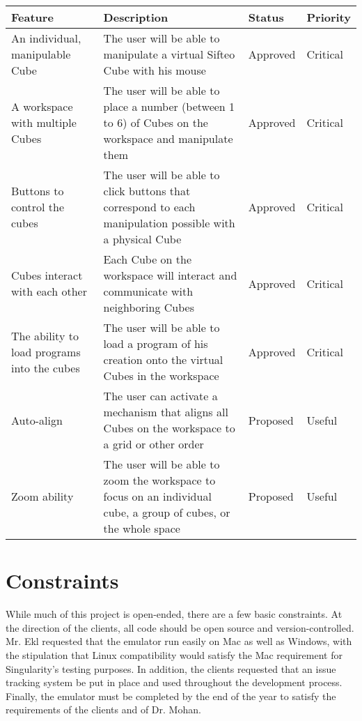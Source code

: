 \documentclass[12pt]{article}
\begin{document}
    \begin{table}[h]
      \begin{tabular}{p{1.5in} | p{1.75in} | p{1in} | p{1in}}
        \textbf{Feature} & \textbf{Description} & \textbf{Status} & \textbf{Priority} \\ \hline

        An individual, manipulable Cube &
        The user will be able to manipulate a virtual Sifteo Cube with his mouse &
        Approved &
        Critical \\ \hline

        A workspace with multiple Cubes &
        The user will be able to place a number (between 1 to 6) of Cubes on the workspace and manipulate them &
        Approved &
        Critical \\ \hline

        Buttons to control the cubes &
        The user will be able to click buttons that correspond to each manipulation possible with a physical Cube &
        Approved &
        Critical \\ \hline

        Cubes interact with each other &
        Each Cube on the workspace will interact and communicate with neighboring Cubes &
        Approved &
        Critical \\ \hline

        The ability to load programs into the cubes &
        The user will be able to load a program of his creation onto the virtual Cubes in the workspace &
        Approved &
        Critical \\ \hline

        Auto-align &
        The user can activate a mechanism that aligns all Cubes on the workspace to a grid or other order &
        Proposed &
        Useful \\ \hline

        Zoom ability &
        The user will be able to zoom the workspace to focus on an individual cube, a group of cubes, or the whole space &
        Proposed &
        Useful
      \end{tabular}
    \end{table}

\section{Constraints}
        While much of this project is open-ended, there are a few basic constraints. At the direction of the clients, all code should be open source and version-controlled. Mr. Ekl requested that the emulator run easily on Mac as well as Windows, with the stipulation that Linux compatibility would satisfy the Mac requirement for Singularity's testing purposes. In addition, the clients requested that an issue tracking system be put in place and used throughout the development process. Finally, the emulator must be completed by the end of the year to satisfy the requirements of the clients and of Dr. Mohan.

\clearpage
\printglossaries
\clearpage

\printindex
\end{document}
